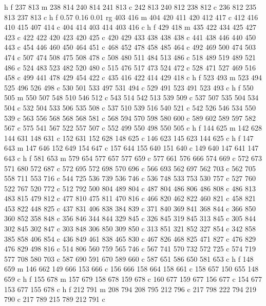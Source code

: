 {{   h f
   237 813 m
   238 814 240 814 241 813 c
   242 813 240 812 238 812 c
   236 812 235 813 237 813 c
   h f
   0.57 0.16 0.01 rg
   403 416 m
   404 420 411 420 412 417 c
   412 416 410 415 407 414 c
   404 414 403 414 403 416 c
   h f
   429 418 m
   435 422 434 425 427 423 c
   422 422 420 423 420 425 c
   420 429 433 438 438 438 c
   441 438 446 440 450 443 c
   454 446 460 450 464 451 c
   468 452 478 458 485 464 c
   492 469 500 474 503 474 c
   507 474 508 475 508 478 c
   508 480 511 484 513 486 c
   518 489 519 489 521 486 c
   524 483 523 482 520 480 c
   515 476 517 473 524 472 c
   528 471 527 469 516 458 c
   499 441 478 429 454 422 c
   435 416 422 414 429 418 c
   h f
   523 493 m
   523 494 525 496 526 498 c
   530 501 533 497 531 494 c
   529 491 523 491 523 493 c
   h f
   550 505 m
   550 507 548 510 546 512 c
   543 514 542 513 539 509 c
   537 507 535 504 534 504 c
   532 504 533 506 535 508 c
   537 510 539 516 540 521 c
   542 526 546 534 550 539 c
   563 556 568 568 568 581 c
   568 594 570 598 580 600 c
   589 602 589 597 582 567 c
   575 541 567 522 557 507 c
   552 499 550 498 550 505 c
   h f
   144 625 m
   142 628 144 631 148 631 c
   152 631 152 628 148 625 c
   146 623 145 623 144 625 c
   h f
   147 643 m
   147 646 152 649 154 647 c
   157 644 155 640 151 640 c
   149 640 147 641 147 643 c
   h f
   581 653 m
   579 654 577 657 577 659 c
   577 661 576 666 574 669 c
   572 673 571 680 572 687 c
   572 695 572 698 570 696 c
   566 693 562 697 562 703 c
   562 705 558 711 553 716 c
   544 725 536 739 536 746 c
   536 748 533 753 530 757 c
   527 760 522 767 520 772 c
   512 792 500 804 489 804 c
   487 804 486 806 486 808 c
   486 813 483 815 479 812 c
   477 810 475 811 470 816 c
   466 820 462 822 460 821 c
   458 821 453 822 448 825 c
   437 831 406 838 384 839 c
   371 840 369 841 368 844 c
   366 850 360 852 358 848 c
   356 846 344 844 329 845 c
   326 845 319 845 313 845 c
   305 844 302 845 302 847 c
   303 848 306 850 309 850 c
   313 851 321 852 327 854 c
   342 858 385 858 406 854 c
   436 849 461 838 465 830 c
   467 826 468 825 471 827 c
   476 829 476 829 498 816 c
   514 806 560 759 565 746 c
   567 741 570 732 572 725 c
   574 719 577 708 580 703 c
   587 690 591 670 589 660 c
   587 651 586 650 581 653 c
   h f
   148 659 m
   146 662 149 666 153 666 c
   156 666 158 664 158 661 c
   158 657 150 655 148 659 c
   h f
   155 678 m
   157 679 158 678 159 678 c
   160 677 159 677 156 677 c
   154 677 153 677 155 678 c
   h f
   212 791 m
   208 794 208 795 212 796 c
   217 798 222 794 219 790 c
   217 789 215 789 212 791 c
}}
